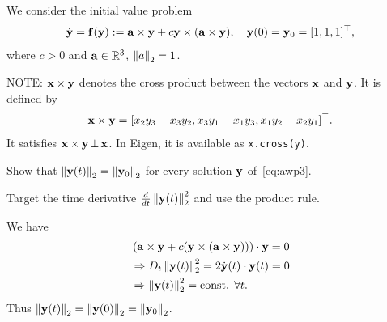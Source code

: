 \begin{problem}\label{prb:cross-prod} 



We consider the initial value problem
\begin{equation}
  \label{eq:awp3}
  \dot{{\mathbf{y}}} = {\mathbf{f}}({\mathbf{y}}) := {\mathbf{a}}\times{\mathbf{y}} + c{\mathbf{y}}\times({\mathbf{a}}\times{\mathbf{y}}),\quad
  {\mathbf{y}}(0) ={\mathbf{y}}_0 =  [1,1,1]^\top,
\end{equation}
where $c>0$ and ${\mathbf{a}}\in\mathbb{R}^3$, $\left\lVert a \right\rVert_2 = 1$.

NOTE: ${\mathbf{x}}\times{\mathbf{y}}$ denotes the cross product between the vectors ${\mathbf{x}}$ and ${\mathbf{y}}$. It is defined by
\[
{\mathbf{x}}\times{\mathbf{y}} = [x_2 y_3 -x_3 y_2 , x_3y_1 - x_1 y_3,x_1y_2 - x_2 y_1]^\top. 
\]
It satisfies ${\mathbf{x}}\times{\mathbf{y}} \,\bot\, {\mathbf{x}}$. In Eigen, it is available as \texttt{x.cross(y)}.



\begin{subproblem}[2]\label{sp:existence}
Show that $\left\lVert {\mathbf{y}}(t) \right\rVert_2=\left\lVert {\mathbf{y}}_0 \right\rVert_2$ for every solution ${\mathbf{y}}$ of~\eqref{eq:awp3}.
\begin{hint}
Target the time derivative $\frac{d}{dt}\left\lVert {\mathbf{y}}(t) \right\rVert_2^2$ and use the product rule.
\end{hint}
\begin{solution}
    We have
    \begin{align*}
      &\left({\mathbf{a}}\times{\mathbf{y}} + c({\mathbf{y}}\times({\mathbf{a}}\times{\mathbf{y}}))\right)\cdot{\mathbf{y}} = 0\\
      &\Rightarrow D_{t}\left\lVert {\mathbf{y}}(t) \right\rVert_2^2 =2 \dot{{\mathbf{y}}}(t)\cdot{\mathbf{y}}(t) =
      0\\
      &\Rightarrow \left\lVert {\mathbf{y}}(t) \right\rVert_2^2 = \text{const. }\forall t.
    \end{align*}
    Thus $\left\lVert {\mathbf{y}}(t) \right\rVert_2=\left\lVert {\mathbf{y}}(0) \right\rVert_2=\left\lVert {\mathbf{y}}_0 \right\rVert_2$.
\end{solution}
\end{subproblem}


\end{problem}
